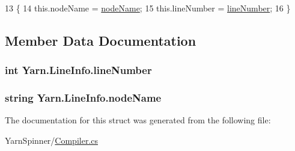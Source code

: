 \begin{DoxyCode}
13         \{
14             this.nodeName = \hyperlink{a00103_a5a91331fb123e29d71d69e096f943c2f}{nodeName};
15             this.lineNumber = \hyperlink{a00103_a7165cafce64a3deafc41b2090ddf8d0e}{lineNumber};
16         \}
\end{DoxyCode}


\subsection{Member Data Documentation}
\hypertarget{a00103_a7165cafce64a3deafc41b2090ddf8d0e}{
\subsubsection[{line\-Number}]{\setlength{\rightskip}{0pt plus 5cm}int Yarn.\-Line\-Info.\-line\-Number}}\label{a00103_a7165cafce64a3deafc41b2090ddf8d0e}
\hypertarget{a00103_a5a91331fb123e29d71d69e096f943c2f}{
\subsubsection[{node\-Name}]{\setlength{\rightskip}{0pt plus 5cm}string Yarn.\-Line\-Info.\-node\-Name}}\label{a00103_a5a91331fb123e29d71d69e096f943c2f}


The documentation for this struct was generated from the following file\-:\begin{DoxyCompactItemize}
\item 
Yarn\-Spinner/\hyperlink{a00261}{Compiler.\-cs}\end{DoxyCompactItemize}
